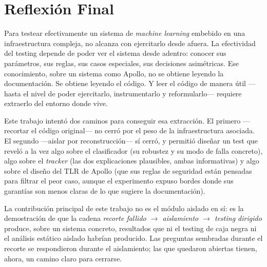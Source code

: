 \section{Reflexión Final}

Para testear efectivamente un sistema de \textit{machine learning} embebido en una infraestructura compleja, no alcanza con ejercitarlo desde afuera. La efectividad del testing depende de poder ver el sistema desde adentro: conocer sus parámetros, sus reglas, sus casos especiales, sus decisiones asimétricas. Ese conocimiento, sobre un sistema como Apollo, no se obtiene leyendo la documentación. Se obtiene leyendo el código. Y leer el código de manera útil ---hasta el nivel de poder ejercitarlo, instrumentarlo y reformularlo--- requiere extraerlo del entorno donde vive.

Este trabajo intentó dos caminos para conseguir esa extracción. El primero ---recortar el código original--- no cerró por el peso de la infraestructura asociada. El segundo ---aislar por reconstrucción--- sí cerró, y permitió diseñar un test que reveló a la vez algo sobre el clasificador (su robustez y su modo de falla concreto), algo sobre el \textit{tracker} (las dos explicaciones plausibles, ambas informativas) y algo sobre el diseño del TLR de Apollo (que sus reglas de seguridad están pensadas para filtrar el peor caso, aunque el experimento expuso bordes donde sus garantías son menos claras de lo que sugiere la documentación).

La contribución principal de este trabajo no es el módulo aislado en sí: es la demostración de que la cadena \textit{recorte fallido $\to$ aislamiento $\to$ testing dirigido} produce, sobre un sistema concreto, resultados que ni el testing de caja negra ni el análisis estático aislado habrían producido. Las preguntas sembradas durante el recorte se respondieron durante el aislamiento; las que quedaron abiertas tienen, ahora, un camino claro para cerrarse.